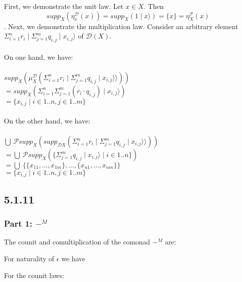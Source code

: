 \documentclass{article}
\begin{document}
First, we demonstrate the unit law. Let $x \in X$. Then 
$$\mathit{supp}_X(\eta_x^{\mathcal D}(x)) = \mathit{supp}_X(1 \mid x \rangle) = \{ x \} = \eta_{X}^{\mathcal P}(x)$$.
Next, we demonstrate the multiplication law. Consider an arbitrary element
$\Sigma_{i=1}^n r_i \mid \Sigma_{j=1}^m q_{i,j} \mid x_{i,j} \rangle$ of $\mathcal D(X)$.\\~\\
On one hand, we have:\\~\\
$\mathit{supp}_X(\mu^{\mathcal D}_X(\Sigma_{i=1}^n r_i \mid \Sigma_{j=1}^m q_{i,j} \mid x_{i,j} \rangle \rangle))$\\
$= \mathit{supp}_X (\Sigma_{i=1}^n \Sigma_{j=1}^m (r_i \cdot q_{i,j}) \mid x_{i,j} \rangle)$\\
$= \{ x_{i,j} \mid i \in 1..n, j \in 1..m \}$\\~\\
On the other hand, we have:\\~\\
$\bigcup~\mathcal P \mathit{supp}_{X}(\mathit{supp}_{\mathcal D X}(\Sigma_{i=1}^n r_i \mid \Sigma_{j=1}^m q_{i,j} \mid x_{i,j} \rangle \rangle))$\\
$= \bigcup~\mathcal P \mathit{supp}_{X}(\{ \Sigma_{j=1}^m q_{i,j} \mid x_{i,j} \rangle \mid i \in 1..n \})$\\
$= \bigcup~\{ \{x_{11},\ldots,x_{1m} \}, \ldots, \{ x_{n1}, \ldots, x_{nm} \} \}$\\
$= \{ x_{i,j} \mid i \in 1..n, j \in 1..m \}$

\subsection*{5.1.11}

\subsubsection*{Part 1: $-^M$}

The counit and comultiplication of the comonad $-^M$ are:

For naturality of $\epsilon$ we have\\
For the counit laws:
\end{document}
